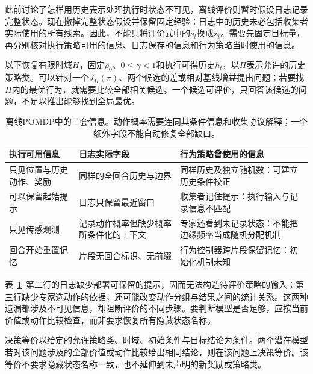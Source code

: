 此前讨论了怎样用历史表示处理执行时状态不可见，离线评价则暂时假设日志记录完整状态。现在撤掉完整状态假设并保留固定经验：日志中的历史未必包括收集者实际使用的所有线索。因此，不能只将评价式中的$s_t$换成$\bm z_t$。需要先固定目标量，再分别核对执行策略可用的信息、日志保存的信息和行为策略当时使用的信息。

以下恢复有限时域$H$，固定$\rho_0$、$0\leq\gamma<1$和执行可得历史$h_t$，以$\Pi$表示允许的历史策略类。可以针对一个$J_H(\pi)$、两个候选的差或相对基线增益提出问题；若要找$\Pi$内的最优行为，就需要比较全部相关候选。一个候选可评价，只回答该候选的问题，不足以推出能够找到全局最优。

\begin{table}[htbp]
  \centering
  \small
  \begin{tabularx}{\linewidth}{XXX}
    \toprule
    执行可用信息 & 日志实际字段 & 行为策略曾使用的信息 \\
    \midrule
    只见位置与历史动作、奖励 & 同样的全回合历史与边界 & 同样历史及独立随机数：可建立历史条件校正 \\
    可以保留起始提示 & 日志只保留最近窗口 & 收集者记住提示：执行输入与记录信息不匹配 \\
    只见传感观测 & 记录动作概率但缺少概率所条件化的上下文 & 专家还看到未记录状态：不能把边缘频率当成随机分配机制 \\
    回合开始重置记忆 & 片段无回合标识、无前缀 & 行为控制器跨片段保留记忆：初始化机制未知 \\
    \bottomrule
  \end{tabularx}
  \caption{离线POMDP中的三套信息。动作概率需要连同其条件信息和收集协议解释；一个额外字段不能自动修复全部缺口。}
  \label{tab:rl-information-information-sets}
\end{table}

表~\ref{tab:rl-information-information-sets}~第二行的日志缺少部署可保留的提示，因而无法构造待评价策略的输入；第三行缺少专家选动作的依据，还可能改变动作分组与结果之间的统计关系。这两种遗漏都涉及不可见信息，却阻断评价的不同步骤。要判断模型是否足够，应按当前价值或动作比较检查，而非要求恢复所有隐藏状态名称。

\begin{definition}[给定问题上的决策等价]
  \label{def:rl-information-decision-equivalence}
  决策等价以给定的允许策略类、时域、初始条件与目标结论为条件。两个潜在模型若对该问题涉及的全部价值或动作比较给出相同结论，则在该问题上决策等价。该等价不要求隐藏状态名称一致，也不延伸到未声明的新奖励或策略类。
\end{definition}

